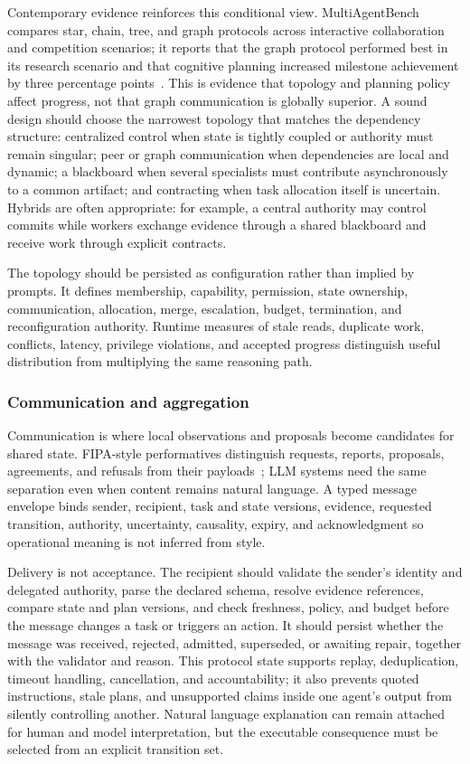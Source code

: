 Contemporary evidence reinforces this conditional view. MultiAgentBench compares star, chain, tree, and graph protocols across interactive collaboration and competition scenarios; it reports that the graph protocol performed best in its research scenario and that cognitive planning increased milestone achievement by three percentage points~\cite{zhu2025multiagentbench}. This is evidence that topology and planning policy affect progress, not that graph communication is globally superior. A sound design should choose the narrowest topology that matches the dependency structure: centralized control when state is tightly coupled or authority must remain singular; peer or graph communication when dependencies are local and dynamic; a blackboard when several specialists must contribute asynchronously to a common artifact; and contracting when task allocation itself is uncertain. Hybrids are often appropriate: for example, a central authority may control commits while workers exchange evidence through a shared blackboard and receive work through explicit contracts.

The topology should be persisted as configuration rather than implied by prompts. It defines membership, capability, permission, state ownership, communication, allocation, merge, escalation, budget, termination, and reconfiguration authority. Runtime measures of stale reads, duplicate work, conflicts, latency, privilege violations, and accepted progress distinguish useful distribution from multiplying the same reasoning path.

\subsubsection{Communication and aggregation}

Communication is where local observations and proposals become candidates for shared state. FIPA-style performatives distinguish requests, reports, proposals, agreements, and refusals from their payloads~\cite{fipa2002communicative}; LLM systems need the same separation even when content remains natural language. A typed message envelope binds sender, recipient, task and state versions, evidence, requested transition, authority, uncertainty, causality, expiry, and acknowledgment so operational meaning is not inferred from style.

Delivery is not acceptance. The recipient should validate the sender's identity and delegated authority, parse the declared schema, resolve evidence references, compare state and plan versions, and check freshness, policy, and budget before the message changes a task or triggers an action. It should persist whether the message was received, rejected, admitted, superseded, or awaiting repair, together with the validator and reason. This protocol state supports replay, deduplication, timeout handling, cancellation, and accountability; it also prevents quoted instructions, stale plans, and unsupported claims inside one agent's output from silently controlling another. Natural language explanation can remain attached for human and model interpretation, but the executable consequence must be selected from an explicit transition set.

